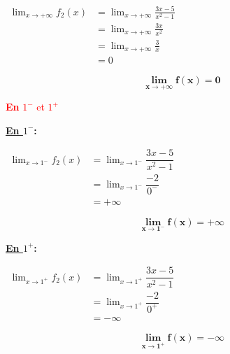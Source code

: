\documentclass[12pt,a4paper]{article}
\begin{document}
\begin{enumerate}
		\(
		\begin{aligned}
				\lim_{x\to +\infty} f_{2}(x)&=\lim_{x\to +\infty}\frac{3x-5}{x^{2}-1}\\
																		&=\lim_{x\to +\infty}\frac{3x}{x^{2}}\\
																		&=\lim_{x\to +\infty}\frac{3}{x}\\
																		&=0
		\end{aligned}
		\)		

    \begin{resultbox}
    \[
    \mathbf{\lim_{x\to +\infty}f(x) = 0}
    \]
		\end{resultbox}	

\textcolor{red}{\textbf{En} $1^-$ et $1^+$}

		\begin{center}
\end{center}		
		
		\textbf{\underline{En $1^{-}$}:}

		\(
		\begin{aligned}
				\lim_{x\to 1^{-}} f_{2}(x)&=\lim_{x\to 1^{-}}\dfrac{3x-5}{x^{2}-1}\\
																	&=\lim_{x\to 1^{-}}\dfrac{-2}{0^{-}}\\
																	&=+\infty
		\end{aligned}
		\)		

    \begin{resultbox}
    \[
    \mathbf{\lim_{x\to 1^{-}}f(x) = +\infty}
    \]
		\end{resultbox}		
		
		\textbf{\underline{En $1^{+}$}:}   

		\(
		\begin{aligned}
					\lim_{x\to 1^{+}} f_{2}(x)&=\lim_{x\to 1^{+}}\dfrac{3x-5}{x^{2}-1}\\
																		&=\lim_{x\to 1^{+}}\dfrac{-2}{0^{+}}\\
																		&=-\infty
		\end{aligned}
		\)    
    
    \begin{resultbox}
    \[
    \mathbf{\lim_{x\to 1^{+}}f(x) = -\infty}
    \]
		\end{resultbox}    
    

\end{enumerate}
\end{document}
